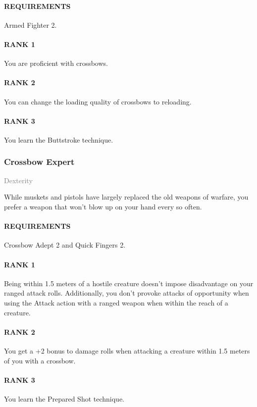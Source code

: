\paragraph{REQUIREMENTS} Armed Fighter 2.
\paragraph{RANK 1} You are proficient with crossbows.
\paragraph{RANK 2} You can change the loading quality of crossbows to reloading.
\paragraph{RANK 3} You learn the Buttstroke technique.

\subsubsection{Crossbow Expert} \label{feat::crossbowexpert}
\small{\textcolor{gray}{Dexterity}}

\normalsize
While muskets and pistols have largely replaced the old weapons of warfare, you prefer a weapon that won't blow up on your hand every so often.
\paragraph{REQUIREMENTS} Crossbow Adept 2 and Quick Fingers 2.
\paragraph{RANK 1} Being within 1.5 meters of a hostile creature doesn't impose disadvantage on your ranged attack rolls.
Additionally, you don't provoke attacks of opportunity when using the Attack action with a ranged weapon when within the reach of a creature.
\paragraph{RANK 2} You get a +2 bonus to damage rolls when attacking a creature within 1.5 meters of you with a crossbow.
\paragraph{RANK 3} You learn the Prepared Shot technique.

